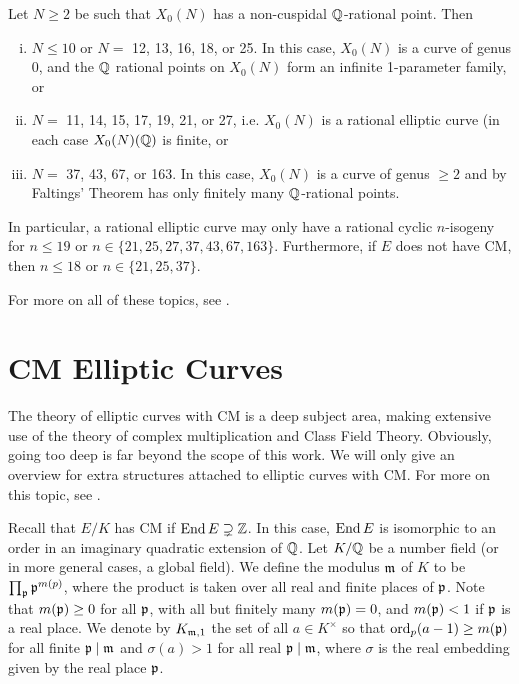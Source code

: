 \begin{thm} \label{thm:cusp_isog}
Let $N \geq 2$ be such that $X_0(N)$ has a non-cuspidal $\mathbb{Q}$-rational point. Then
	\begin{enumerate}[(i)] \itemsep-1em
	\item $N \leq 10$ or $N=$ 12, 13, 16, 18, or 25. In this case, $X_0(N)$ is a curve of genus 0, and the $\mathbb{Q}$ rational points on $X_0(N)$ form an infinite 1-parameter family, or
	\item $N=$ 11, 14, 15, 17, 19, 21, or 27, i.e. $X_0(N)$ is a rational elliptic curve (in each case $X_0(N)(\mathbb{Q})$ is finite, or
	\item $N=$ 37, 43, 67, or 163. In this case, $X_0(N)$ is a curve of genus $\geq 2$ and by Faltings' Theorem has only finitely many $\mathbb{Q}$-rational points. 
	\end{enumerate}
In particular, a rational elliptic curve may only have a rational cyclic $n$-isogeny for $n \leq 19$ or $n \in \{21,25,27,37,43,67,163\}$. Furthermore, if $E$ does not have CM, then $n \leq 18$ or $n \in \{21,25,37\}$.
\end{thm}


For more on all of these topics, see \cite{diamondshurman}. 








\section{CM Elliptic Curves\label{sec:cmec}}

The theory of elliptic curves with CM is a deep subject area, making extensive use of the theory of complex multiplication and Class Field Theory. Obviously, going too deep is far beyond the scope of this work. We will only give an overview for extra structures attached to elliptic curves with CM. For more on this topic, see \cite{silvermanadvanced}.


Recall that $E/K$ has CM if $\operatorname{End} E \supsetneq \mathbb{Z}$. In this case, $\operatorname{End} E$ is isomorphic to an order in an imaginary quadratic extension of $\mathbb{Q}$. Let $K/\mathbb{Q}$ be a number field (or in more general cases, a global field). We define the modulus $\mathfrak{m}$ of $K$ to be $\prod_{\mathfrak{p}} \mathfrak{p}^{m(p)}$, where the product is taken over all real and finite places of $\mathfrak{p}$. Note that $m(\mathfrak{p}) \geq 0$ for all $\mathfrak{p}$, with all but finitely many $m(\mathfrak{p})= 0$, and $m(\mathfrak{p}) < 1$ if $\mathfrak{p}$ is a real place. We denote by $K_{\mathfrak{m},1}$ the set of all $a \in K^\times$ so that $\operatorname{ord}_p(a - 1) \geq m(\mathfrak{p})$ for all finite $\mathfrak{p} \mid \mathfrak{m}$ and $\sigma(a) > 1$ for all real $\mathfrak{p} \mid \mathfrak{m}$, where $\sigma$ is the real embedding given by the real place $\mathfrak{p}$. 



